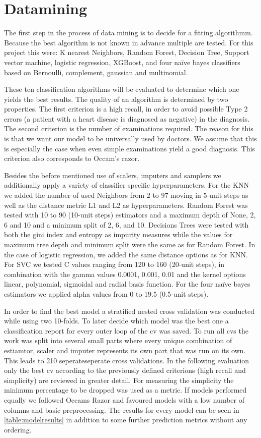 \section{Datamining} \label{sec:datamining}
The first step in the process of data mining is to decide for a fitting algorithmm. Because the best algorithm is not known in advance multiple are tested. For this project this were: K nearest Neighbors, Random Forest, Decision Tree, Support vector machine, logistic regression, XGBoost, and four naïve bayes classifiers based on Bernoulli, complement, gaussian  and multinomial.

These ten classification algorithms will be evaluated to determine which one yields the best results. The quality of an algorithm is determined by two properties. The first criterion is a high recall, in order to avoid possible Type 2 errors (a patient with a heart disease is diagnosed as negative) in the diagnosis. The second criterion is the number of examinations required. The reason for this is that we want our model to be universally used by doctors. We assume that this is especially the case when even simple examinations yield a good diagnosis. This criterion also corresponds to Occam’s razor.

Besides the before mentioned use of scalers, imputers and samplers we additionally apply a variety of classifier specific hyperparameters. For the KNN we added the number of used Neighbors from 2 to 97 moving in 5-unit steps as well as the distance metric L1 and L2 as hyperparameters. Random Forest was tested with 10 to 90 (10-unit steps) estimators and a maximum depth of None, 2, 6 and 10 and a minimum split of 2, 6, and 10. Decisions Trees were tested with both the gini index and entropy as impurity measures while the values for maximum tree depth and minimum split were the same as for Random Forest. In the case of logistic regression, we added the same distance options as for KNN. For SVC we tested C values ranging from 120 to 160 (20-unit steps), in combination with the gamma values 0.0001, 0.001, 0.01 and the kernel options linear, polynomial, sigmoidal and radial basis function. For the four naïve bayes estimators we applied alpha values from 0 to 19.5 (0.5-unit steps).

In order to find the best model a stratified nested cross validation was conducted while using two 10-folds. To later decide which model was the best one a classification report for every outer loop of the cv was saved. To run all cvs the work was split into several small parts where every unique combination of estiamtor, scaler and imputer represents its own part that was run on its own. This leads to 210 seperateseperate cross validations. In the following evaluation only the best cv according to the previously defined criterions (high recall and simplicity) are reviewed in greater detail. For measuring the simplicity the minimum percentage to be dropped was used as a metric. If models performed equally we followed Occams Razor and favoured models with a low number of columns and basic preprocessing. The results for every model can be seen in \cref{table:modelresults} in addition to some further prediction metrics without any ordering.


